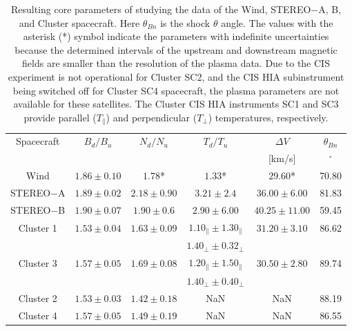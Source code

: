 \documentclass[draft]{agujournal2019}
\begin{document}
\begin{table}[h]
  \centering
\caption{Resulting core parameters of studying the data of the Wind, STEREO$-$A, B, and Cluster spacecraft. Here $\theta_{Bn}$ is the shock $\theta$ angle. The values with the asterisk (*) symbol indicate the parameters with indefinite uncertainties because the determined intervals of the upstream and downstream magnetic fields are smaller than the resolution of the plasma data. Due to the CIS experiment is not operational for Cluster SC2, and the CIS HIA subinstrument being switched off for Cluster SC4 spacecraft, the plasma parameters are not available for these satellites. The Cluster CIS HIA instruments SC1 and SC3 provide parallel ($T_{\parallel}$) and perpendicular ($T_{\perp}$) temperatures, respectively. \label{tab:core1}}
\begin{tabular}{cccccc}
\hline
 Spacecraft & $B_{d}/B_{u}$  & $N_{d}/N_{u}$ & $T_{d}/T_{u}$ & $\Delta V$ & $\theta_{Bn}$ \\
 & & & & [km/s] & ${}^{\circ}$\\
 \hline
Wind    & $1.86\pm 0.10$   & $1.78$* & $1.33$*  & $29.60$* & 70.80 \\
 STEREO$-$A   & $1.89\pm 0.02$     & $2.18\pm 0.90$ & $3.21\pm 2.4$ & $36.00\pm 6.00$   &81.83 \\
STEREO$-$B   & $1.90\pm 0.07$ & $1.90\pm 0.6$ & $2.90\pm 6.00$ & $40.25\pm 11.00$ & 59.45 \\
 Cluster 1   & $1.53\pm 0.04$ & $1.63\pm 0.09$ & $1.10_{\parallel}\pm 1.30_{\parallel}$ & $31.20\pm 3.10$ & 86.62 \\
 &&&$1.40_{\perp}\pm 0.32_{\perp}$ & &\\
 Cluster 3   & $1.57\pm 0.05$ & $1.69\pm 0.08$ & $1.20_{\parallel}\pm 1.50_{\parallel}$ & $30.50\pm 2.80$ & 89.74 \\
 &&&$1.40_{\perp}\pm 0.40_{\perp}$&&\\
 Cluster 2   & $1.53\pm 0.03$ & $1.42\pm 0.18$ & NaN & NaN & 88.19 \\
 Cluster 4   & $1.57\pm 0.05$ & $1.49\pm 0.19$ & NaN & NaN & 86.55 \\
\end{tabular}
\end{table}

\pagebreak
\end{document}

